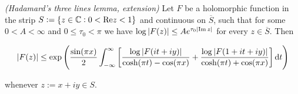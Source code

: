 \vspace{2mm}

\begin{mdframed}
	\begin{lemma}\emph{(Hadamard's three lines lemma, extension)}
		Let $F$ be a holomorphic function in the strip $S := \cbr[0]{z \in \mathbb{C}: 0 < \mathrm{Re}z < 1}$ and continuous on $\overline{S}$, such that for some $0 < A < \infty$ and $0 \leq \tau_0 < \pi$ we have $\log \abs[0]{ F( z )} \leq A e^{\tau_0 \abs[0]{ \Im z}}$ for every $z \in \overline{S}$. Then

			\begin{equation*}
				\abs[0]{ F(z) } \leq \exp\del{ \frac{\sin(\pi x)}{2} \int_{-\infty}^\infty \sbr{ \frac{\log \abs[0]{ F(it + iy)}}{\cosh(\pi t) - \cos(\pi x)} + \frac{\log \abs[0]{ F(1 + it + iy)}}{\cosh(\pi t) + \cos(\pi x)} } \d t}
			\end{equation*}

			\noindent whenever $z := x + iy \in S$.
			\label{lem:EHTL}
	\end{lemma}
\end{mdframed}

